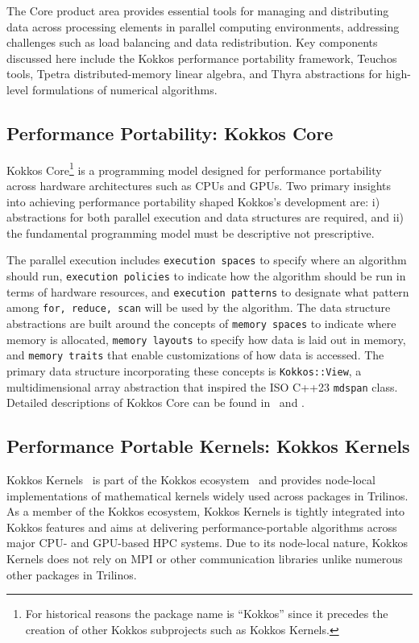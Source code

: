 
The Core product area provides essential tools for managing and distributing data across processing elements in parallel computing environments, addressing challenges such as load balancing and data redistribution. Key components discussed here include the Kokkos performance portability framework, Teuchos tools, Tpetra distributed-memory linear algebra, and Thyra abstractions for high-level formulations of numerical algorithms.

\subsection{Performance Portability: Kokkos Core}\label{subsec:kokkos}
Kokkos Core\footnote{For historical reasons the package name is ``Kokkos'' since it precedes the creation of other Kokkos subprojects such as Kokkos Kernels.} is a programming model designed for performance portability across hardware architectures such as CPUs and GPUs. Two primary insights into achieving performance portability shaped Kokkos's development are:
i) abstractions for both parallel execution and data structures are required, and
ii) the fundamental programming model must be descriptive not prescriptive.

The parallel execution includes \texttt{execution spaces} to specify where an algorithm should run, \texttt{execution policies} to indicate how the algorithm should be run in terms of hardware resources, and \texttt{execution patterns} to designate what pattern among \texttt{for, reduce, scan} will be used by the algorithm. The data structure abstractions are built around the concepts of \texttt{memory spaces} to indicate where memory is allocated, \texttt{memory layouts} to specify how data is laid out in memory, and \texttt{memory traits} that enable customizations of how data is accessed. The primary data structure incorporating
these concepts is \texttt{Kokkos::View}, a multidimensional array abstraction that inspired
the ISO C++23 \texttt{mdspan} class. Detailed descriptions of Kokkos Core can be found
in~\cite{edwards2014} and \cite{trott2022kokkos}.

\subsection{Performance Portable Kernels: Kokkos Kernels}\label{subsec:kk}
Kokkos Kernels~\cite{rajamanickam2021kokkoskernels} is part of the Kokkos ecosystem~\cite{trott2021kokkos} and provides node-local implementations of mathematical kernels widely used across packages in Trilinos. As a member of the Kokkos ecosystem, Kokkos Kernels is tightly integrated into Kokkos features and aims at delivering performance-portable algorithms across major CPU- and GPU-based HPC systems. Due to its node-local nature, Kokkos Kernels does not rely on MPI or other communication libraries unlike numerous other packages in Trilinos.

